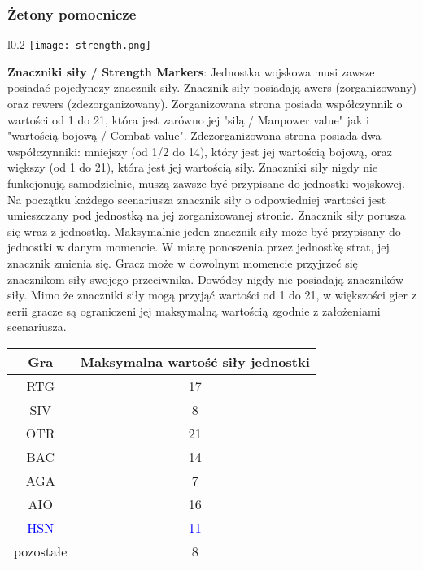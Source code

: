 \subsubsection*{Żetony pomocnicze}
\begin{wrapfigure}{l}{0.2\textwidth}
    \texttt{[image: strength.png]}
\end{wrapfigure}
\textbf{Znaczniki siły / Strength Markers}: Jednostka wojskowa musi zawsze posiadać pojedynczy znacznik siły. Znacznik siły posiadają awers (zorganizowany) oraz rewers (zdezorganizowany). Zorganizowana strona posiada współczynnik o wartości od 1 do 21, która jest zarówno jej "silą / Manpower value" jak i "wartością bojową / Combat value". Zdezorganizowana strona posiada dwa współczynniki: mniejszy (od 1/2 do 14), który jest jej wartością bojową, oraz większy (od 1 do 21), która jest jej wartością siły. Znaczniki siły nigdy nie funkcjonują samodzielnie, muszą zawsze być przypisane do jednostki wojskowej. Na początku każdego scenariusza znacznik siły o odpowiedniej wartości jest umieszczany pod jednostką na jej zorganizowanej stronie. Znacznik siły porusza się wraz z jednostką. Maksymalnie jeden znacznik siły może być przypisany do jednostki w danym momencie. W miarę ponoszenia przez jednostkę strat, jej znacznik zmienia się. Gracz może w dowolnym momencie przyjrzeć się znacznikom siły swojego przeciwnika. Dowódcy nigdy nie posiadają znaczników siły.
Mimo że znaczniki siły mogą przyjąć wartości od 1 do 21, w większości gier z serii gracze są ograniczeni jej maksymalną wartością zgodnie z założeniami scenariusza.\par
\begin{center}
    \begin{tabular}{ |c|c| }
        \hline
        \rowcolor{gray!80}\textbf{Gra} & \textbf{Maksymalna wartość siły jednostki} \\
        \hline
        RTG                            & 17                                         \\
        \hline
        SIV                            & 8                                          \\
        \hline
        OTR                            & 21                                         \\
        \hline
        BAC                            & 14                                         \\
        \hline
        AGA                            & 7                                          \\
        \hline
        AIO                            & 16                                         \\
        \hline
        \textcolor{blue}{HSN}          & \textcolor{blue}{11}                       \\
        \hline
        pozostałe                      & 8                                          \\
        \hline
    \end{tabular}
\end{center}


